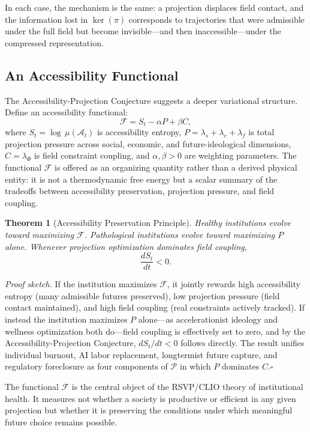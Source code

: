 \documentclass[12pt, a4paper]{article}
\theoremstyle{plain}
\newtheorem{theorem}{Theorem}
\theoremstyle{definition}
\theoremstyle{remark}
\begin{document}
In each case, the mechanism is the same: a projection displaces field contact,
and the information lost in $\ker(\pi)$ corresponds to trajectories that were
admissible under the full field but become invisible---and then inaccessible---under
the compressed representation.

\subsection{An Accessibility Functional}

The Accessibility-Projection Conjecture suggests a deeper variational structure.
Define an accessibility functional:
\[
\mathcal{F} = S_t - \alpha P + \beta C,
\]
where $S_t = \log\,\mu(\mathcal{A}_t)$ is accessibility entropy,
$P = \lambda_s + \lambda_e + \lambda_f$ is total projection pressure across
social, economic, and future-ideological dimensions,
$C = \lambda_\Phi$ is field constraint coupling, and
$\alpha, \beta > 0$ are weighting parameters.
The functional $\mathcal{F}$ is offered as an organizing quantity rather than a
derived physical entity: it is not a thermodynamic free energy but a scalar summary
of the tradeoffs between accessibility preservation, projection pressure, and field coupling.

\begin{theorem}[Accessibility Preservation Principle]
Healthy institutions evolve toward maximizing $\mathcal{F}$.
Pathological institutions evolve toward maximizing $P$ alone.
Whenever projection optimization dominates field coupling,
\[
\frac{dS_t}{dt} < 0.
\]
\end{theorem}

\textit{Proof sketch.}
If the institution maximizes $\mathcal{F}$, it jointly rewards high accessibility
entropy (many admissible futures preserved), low projection pressure (field contact
maintained), and high field coupling (real constraints actively tracked).
If instead the institution maximizes $P$ alone---as accelerationist ideology and
wellness optimization both do---field coupling is effectively set to zero, and by
the Accessibility-Projection Conjecture, $dS_t/dt < 0$ follows directly.
The result unifies individual burnout, AI labor replacement, longtermist future
capture, and regulatory foreclosure as four components of $\mathcal{P}$ in which
$P$ dominates $C$.\hfill$\square$

The functional $\mathcal{F}$ is the central object of the RSVP/CLIO theory of
institutional health.
It measures not whether a society is productive or efficient in any given projection
but whether it is preserving the conditions under which meaningful future choice
remains possible.
\end{document}
